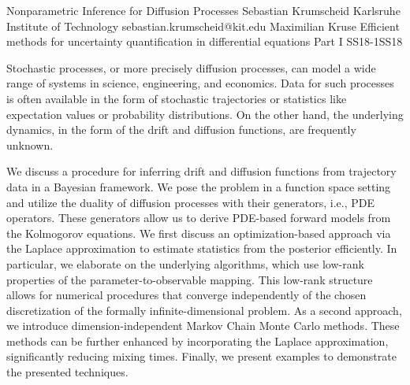 \begin{talk}
  {Nonparametric Inference for Diffusion Processes}%
  {Sebastian Krumscheid}%
  {Karlsruhe Institute of Technology}%
  {sebastian.krumscheid@kit.edu}%
  {Maximilian Kruse}%
{Efficient methods for uncertainty quantification in differential equations Part I}
{}{SS18-1}{SS18}


Stochastic processes, or more precisely diffusion processes, can model a wide range of systems in science, engineering, and economics. Data for such processes is often available in the form of stochastic trajectories or statistics like expectation values or probability distributions. On the other hand, the underlying dynamics, in the form of the drift and diffusion functions, are frequently unknown.

We discuss a procedure for inferring drift and diffusion functions from trajectory data in a Bayesian framework. We pose the problem in a function space setting and utilize the duality of diffusion processes with their generators, i.e., PDE operators. These generators allow us to derive PDE-based forward models from the Kolmogorov equations. We first discuss an optimization-based approach via the Laplace approximation to estimate statistics from the posterior efficiently. In particular, we elaborate on the underlying algorithms, which use low-rank properties of the parameter-to-observable mapping. This low-rank structure allows for numerical procedures that converge independently of the chosen discretization of the formally infinite-dimensional problem. As a second approach, we introduce dimension-independent Markov Chain Monte Carlo methods. These methods can be further enhanced by incorporating the Laplace approximation, significantly reducing mixing times. Finally, we present examples to demonstrate the presented techniques.

\end{talk}

